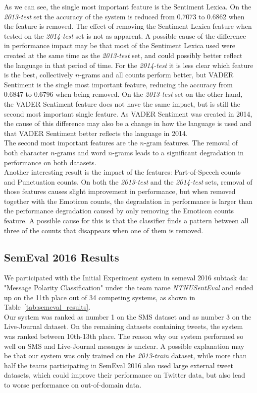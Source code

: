 As we can see, the single most important feature is the Sentiment Lexica. On the \textit{2013-test} set the accuracy of the system is reduced from 0.7073 to 0.6862 when the feature is removed. The effect of removing the Sentiment Lexica feature when tested on the \textit{2014-test} set is not as apparent. A possible cause of the difference in performance impact may be that most of the Sentiment Lexica used were created at the same time as the \textit{2013-test} set, and could possibly better reflect the language in that period of time. For the \textit{2014-test} it is less clear which feature is the best, collectively $n$-grams and all counts perform better, but VADER Sentiment is the single most important feature, reducing the accuracy from 0.6847 to 0.6796 when being removed. On the \textit{2013-test} set on the other hand, the VADER Sentiment feature does not have the same impact, but is still the second most important single feature. As VADER Sentiment was created in 2014, the cause of this difference may also be a change in how the language is used and that VADER Sentiment better reflects the language in 2014.  \\

The second most important features are the $n$-gram features. The removal of both character $n$-grams and word $n$-grams leads to a significant degradation in performance on both datasets. \\

Another interesting result is the impact of the features: Part-of-Speech counts and Punctuation counts. On both the \textit{2013-test} and the \textit{2014-test} sets, removal of those features causes slight improvement in performance, but when removed together with the Emoticon counts, the degradation in performance is larger than the performance degradation caused by only removing the Emoticon counts feature. A possible cause for this is that the classifier finds a pattern between all three of the counts that disappears when one of them is removed.


\subsection{SemEval 2016 Results}
We participated with the Initial Experiment system in \ac{semeval} 2016 subtask 4a: "Message Polarity Classification" under the team name \textit{NTNUSentEval} and ended up on the 11th place out of 34 competing systems, as shown in Table~\ref{tab:semeval_results}. \\

Our system was ranked as number 1 on the SMS dataset and as number 3 on the Live-Journal dataset. On the remaining datasets containing tweets, the system was ranked between 10th-13th place. The reason why our system performed so well on SMS and Live-Journal messages is unclear. A possible explanation may be that our system was only trained on the \textit{2013-train} dataset, while more than half the teams participating in SemEval 2016 also used large external tweet datasets, which could improve their performance on Twitter data, but also lead to worse performance on out-of-domain data. 

\glsresetall